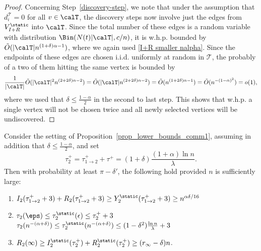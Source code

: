 \documentclass[11pt]{article}
\begin{document}
\begin{proof}
Concerning Step~\ref{discovery-step}, we note that under the assumption that  $d_i^\mathcal T=0$ for all $v\in\calT$, the discovery steps now involve just the edges from $V_{I+R}^\static$ into $\calT$.  Since the total number of these edges is a random variable with distribution  $\Bin(N(t)|\calT|,c/n)$, it is w.h.p. bounded by $\tilde O(|\calT|n^{(1+\delta)\alpha-1})$, where we again used
\eqref{I+R smaller nalpha}.  
  Since the endpoints of these edges are chosen i.i.d. uniformly at random in $\mathcal T$, the probably of a two of them hitting the same vertex is bounded by
  $$\frac 1{|\calT|}\tilde O(|\calT|^2n^{(2+2\delta)\alpha-2})=
  \tilde O(|\calT|n^{(2+2\delta)\alpha-2})
  =\tilde O(n^{(1+2\delta)\alpha-1})=\tilde O(n^{-(1-\alpha)^2})=o(1),
   $$
where we used that $\delta\leq\frac {1-\alpha}2$   in the second to last step.
This shows that w.h.p. a single vertex will not be chosen twice and all newly selected vertices will be undiscovered.
\end{proof}


\begin{proposition}\label{prop_lower_bounds_comm2}
Consider the setting of Proposition~\ref{prop_lower_bounds_comm1}, assuming in addition that $\delta\leq \frac {1-\alpha}2$, and set 
$$\tau_2^+=\tau_{1\to 2}^++\tau^+
    =(1+\delta)\frac{(1+\alpha)\ln n}\lambda.$$
Then with probability at least $\pi - \delta'$, the following hold provided $n$ is sufficiently large:
\begin{enumerate}
\item   
    $I_2(\tau^+_{1\to 2}+3)+R_2(\tau^+_{1\to 2}+3)\geq Y_2^{\static}(\tau^+_{1\to 2}+3)\geq n^{{\alpha\delta}/{16}}$
    
\item   
    $\tau_2(\eps)\leq \tau_2^{\static}(\epsilon)\leq \tau_2^++3$ 
\quad{}\quad 
    $\tau_2(n^{-(\alpha+\delta)})\leq \tau_2^\static(n^{-(\alpha+\delta)})
    \leq(1 - \delta^2)\frac{\ln n}{\lambda}+3$
\item 
    $R_2(\infty)\ge I_2^{\static}(\tau^+_2) +R_2^\static(\tau^+_2)\ge (r_\infty - \delta) n$.
\end{enumerate}
\end{proposition}
\end{document}
